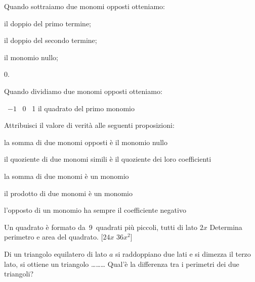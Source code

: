 \begin{esercizio}
 \label{ese:9.38}
Quando sottraiamo due monomi opposti otteniamo:
\begin{enumeratea}
\item il doppio del primo termine;
\item il doppio del secondo termine;
\item il monomio nullo;
\item 0.
\end{enumeratea}
\end{esercizio}

\begin{esercizio}
 \label{ese:9.39}
Quando dividiamo due monomi opposti otteniamo:
\begin{center}
\boxA\quad~$-1$
\quad\boxB\quad~0
\quad\boxC\quad~1
\quad\boxD\quad il quadrato del primo monomio
\end{center}
\end{esercizio}

\begin{esercizio}
 \label{ese:9.40}
Attribuisci il valore di verità alle seguenti proposizioni:
\TabPositions{11cm}
\begin{enumeratea}
 \item la somma di due monomi opposti è il monomio nullo \tab\boxV\quad\boxF
 \item il quoziente di due monomi simili è il quoziente dei loro coefficienti 
\tab\boxV\quad\boxF
 \item la somma di due monomi è un monomio \tab\boxV\quad\boxF
 \item il prodotto di due monomi è un monomio \tab\boxV\quad\boxF
 \item l'opposto di un monomio ha sempre il coefficiente negativo 
\tab\boxV\quad\boxF
\end{enumeratea}
\end{esercizio}

\begin{esercizio}[\Ast]
 \label{ese:9.41}
Un quadrato è formato da~9~quadrati più piccoli, tutti di lato $ 2x $ 
Determina perimetro e area del quadrato. \hfill[$24x$ $ 36x^2 $]
\end{esercizio}

\begin{esercizio}[\Ast]
 \label{ese:9.42}
Di un triangolo equilatero di lato $ a $ si raddoppiano due lati e 
si dimezza il terzo lato, si ottiene un triangolo \ldots\ldots\ldots 
Qual'è la differenza tra i perimetri dei due triangoli? 
\hfill{}
\end{esercizio}

